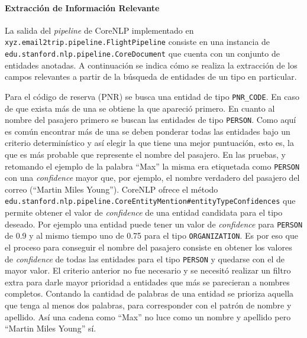 \paragraph{Extracción de Información Relevante}

La salida del \textit{pipeline} de CoreNLP implementado en \nolinkurl{xyz.email2trip.pipeline.FlightPipeline} consiste en
una instancia de \nolinkurl{edu.stanford.nlp.pipeline.CoreDocument} que cuenta con un conjunto de entidades anotadas.
A continuación se indica cómo se realiza la extracción de los campos relevantes a partir de la búsqueda de entidades de
un tipo en particular.

Para el código de reserva (PNR) se busca una entidad de tipo \texttt{PNR\_CODE}.
En caso de que exista más de una se obtiene la que apareció primero.
En cuanto al nombre del pasajero primero se buscan las entidades de tipo \texttt{PERSON}.
Como aquí es común encontrar más de una se deben ponderar todas las entidades bajo un criterio determinístico y así
elegir la que tiene una mejor puntuación, esto es, la que es más probable que represente el nombre del pasajero.
En las pruebas, y retomando el ejemplo de la palabra ``Max'' la misma era etiquetada como \texttt{PERSON} con una
\textit{confidence} mayor que, por ejemplo, el nombre verdadero del pasajero del correo (``Martin Miles Young'').
CoreNLP ofrece el método \texttt{edu.stanford.nlp.pipeline.CoreEntityMention\#entityTypeConfidences} que permite obtener
el valor de \textit{confidence} de una entidad candidata para el tipo deseado.
Por ejemplo una entidad puede tener un valor de \textit{confidence} para \texttt{PERSON} de 0.9 y al mismo tiempo uno de
0.75 para el tipo \texttt{ORGANIZATION}.
Es por eso que el proceso para conseguir el nombre del pasajero consiste en obtener los valores de \textit{confidence}
de todas las entidades para el tipo \texttt{PERSON} y quedarse con el de mayor valor.
El criterio anterior no fue necesario y se necesitó realizar un filtro extra para darle mayor prioridad a entidades que
más se parecieran a nombres completos.
Contando la cantidad de palabras de una entidad se prioriza aquella que tenga al menos dos palabras, para corresponder
con el patrón de nombre y apellido.
Así una cadena como ``Max'' no luce como un nombre y apellido pero ``Martin Miles Young'' sí.

